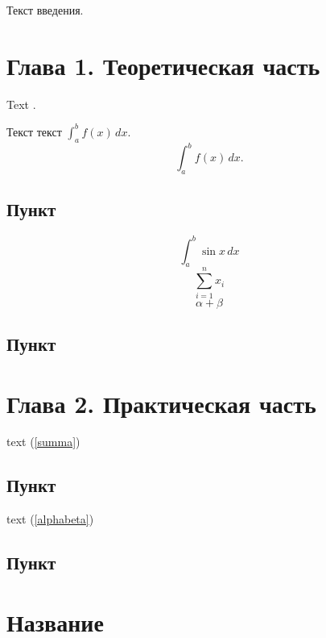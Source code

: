 \documentclass[14pt, a4paper]{extarticle}
\begin{document}
\newpage

\tableofcontents
\newpage

\intro

Текст введения.

\newpage
\section{Глава 1. Теоретическая часть}
Text \cite{book1}.

Текст текст \( \int_a^b f(x)\,dx. \)
\[
\int_a^b f(x)\,dx.
\]

\subsection{Пункт}
\begin{equation}\label{integral}
  \int_{a}^b \sin x\,dx
\end{equation}
\begin{equation}\label{summa}
  \sum\limits_{i=1}^n x_i
\end{equation}
\begin{equation}\label{alphabeta}
  \alpha + \beta
\end{equation}

\subsection{Пункт}

\newpage
\section{Глава 2. Практическая часть}
text (\ref{summa})

\subsection{Пункт}
text (\ref{alphabeta})

\subsection{Пункт}

\newpage
\section{Название}
\end{document}
